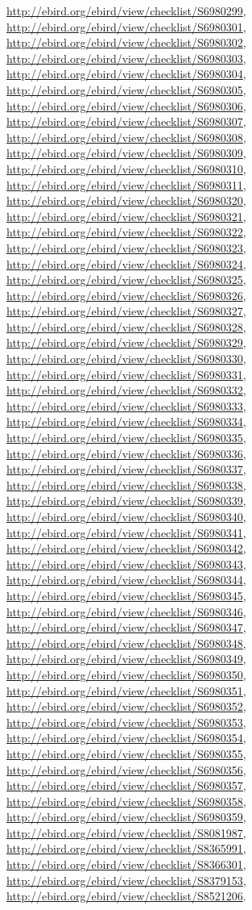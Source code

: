 \documentclass[9pt, article]{memoir}
\begin{document}
\begin{multicols}{2}
\url{http://ebird.org/ebird/view/checklist/S6980299}, 
\url{http://ebird.org/ebird/view/checklist/S6980301}, 
\url{http://ebird.org/ebird/view/checklist/S6980302}, 
\url{http://ebird.org/ebird/view/checklist/S6980303}, 
\url{http://ebird.org/ebird/view/checklist/S6980304}, 
\url{http://ebird.org/ebird/view/checklist/S6980305}, 
\url{http://ebird.org/ebird/view/checklist/S6980306}, 
\url{http://ebird.org/ebird/view/checklist/S6980307}, 
\url{http://ebird.org/ebird/view/checklist/S6980308}, 
\url{http://ebird.org/ebird/view/checklist/S6980309}, 
\url{http://ebird.org/ebird/view/checklist/S6980310}, 
\url{http://ebird.org/ebird/view/checklist/S6980311}, 
\url{http://ebird.org/ebird/view/checklist/S6980320}, 
\url{http://ebird.org/ebird/view/checklist/S6980321}, 
\url{http://ebird.org/ebird/view/checklist/S6980322}, 
\url{http://ebird.org/ebird/view/checklist/S6980323}, 
\url{http://ebird.org/ebird/view/checklist/S6980324}, 
\url{http://ebird.org/ebird/view/checklist/S6980325}, 
\url{http://ebird.org/ebird/view/checklist/S6980326}, 
\url{http://ebird.org/ebird/view/checklist/S6980327}, 
\url{http://ebird.org/ebird/view/checklist/S6980328}, 
\url{http://ebird.org/ebird/view/checklist/S6980329}, 
\url{http://ebird.org/ebird/view/checklist/S6980330}, 
\url{http://ebird.org/ebird/view/checklist/S6980331}, 
\url{http://ebird.org/ebird/view/checklist/S6980332}, 
\url{http://ebird.org/ebird/view/checklist/S6980333}, 
\url{http://ebird.org/ebird/view/checklist/S6980334}, 
\url{http://ebird.org/ebird/view/checklist/S6980335}, 
\url{http://ebird.org/ebird/view/checklist/S6980336}, 
\url{http://ebird.org/ebird/view/checklist/S6980337}, 
\url{http://ebird.org/ebird/view/checklist/S6980338}, 
\url{http://ebird.org/ebird/view/checklist/S6980339}, 
\url{http://ebird.org/ebird/view/checklist/S6980340}, 
\url{http://ebird.org/ebird/view/checklist/S6980341}, 
\url{http://ebird.org/ebird/view/checklist/S6980342}, 
\url{http://ebird.org/ebird/view/checklist/S6980343}, 
\url{http://ebird.org/ebird/view/checklist/S6980344}, 
\url{http://ebird.org/ebird/view/checklist/S6980345}, 
\url{http://ebird.org/ebird/view/checklist/S6980346}, 
\url{http://ebird.org/ebird/view/checklist/S6980347}, 
\url{http://ebird.org/ebird/view/checklist/S6980348}, 
\url{http://ebird.org/ebird/view/checklist/S6980349}, 
\url{http://ebird.org/ebird/view/checklist/S6980350}, 
\url{http://ebird.org/ebird/view/checklist/S6980351}, 
\url{http://ebird.org/ebird/view/checklist/S6980352}, 
\url{http://ebird.org/ebird/view/checklist/S6980353}, 
\url{http://ebird.org/ebird/view/checklist/S6980354}, 
\url{http://ebird.org/ebird/view/checklist/S6980355}, 
\url{http://ebird.org/ebird/view/checklist/S6980356}, 
\url{http://ebird.org/ebird/view/checklist/S6980357}, 
\url{http://ebird.org/ebird/view/checklist/S6980358}, 
\url{http://ebird.org/ebird/view/checklist/S6980359}, 
\url{http://ebird.org/ebird/view/checklist/S8081987}, 
\url{http://ebird.org/ebird/view/checklist/S8365991}, 
\url{http://ebird.org/ebird/view/checklist/S8366301}, 
\url{http://ebird.org/ebird/view/checklist/S8379153}, 
\url{http://ebird.org/ebird/view/checklist/S8521206}.


\end{multicols}
\end{document}

